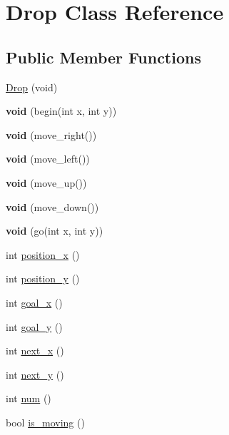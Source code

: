 \hypertarget{class_drop}{}\section{Drop Class Reference}
\label{class_drop}
\subsection*{Public Member Functions}
\begin{DoxyCompactItemize}
\item 
\mbox{\hyperlink{class_drop_a4f50edd210be7bcbea7ae60c36b00a47}{Drop}} (void)
\item 
\mbox{\label{class_drop_a82f9ec9050300a7a073df362bcbc078b}} 
{\bfseries void} (begin(int x, int y))
\item 
\mbox{\label{class_drop_a36e1bb6e31c1e8e5f72ab9ba67689cd1}} 
{\bfseries void} (move\+\_\+right())
\item 
\mbox{\label{class_drop_a1f5015019cf4f7fedea9ea867206dd3c}} 
{\bfseries void} (move\+\_\+left())
\item 
\mbox{\label{class_drop_aaa28139bd052f0a0a3aa62db602a8855}} 
{\bfseries void} (move\+\_\+up())
\item 
\mbox{\label{class_drop_aa21394ff11ff7825f699ec2d3a3d067c}} 
{\bfseries void} (move\+\_\+down())
\item 
\mbox{\label{class_drop_aebdc8ceeb4002f97508ab2504101e554}} 
{\bfseries void} (go(int x, int y))
\item 
int \mbox{\hyperlink{class_drop_a879a7ee2a43d7ae488eca0b266b45388}{position\+\_\+x}} ()
\item 
int \mbox{\hyperlink{class_drop_a7752d271ba81d744a9c503afd9766613}{position\+\_\+y}} ()
\item 
int \mbox{\hyperlink{class_drop_a2ed9f90dfadf25b9796413928477a4d9}{goal\+\_\+x}} ()
\item 
int \mbox{\hyperlink{class_drop_a8dae6265dfd15a8bcc16f99384dbb7b7}{goal\+\_\+y}} ()
\item 
int \mbox{\hyperlink{class_drop_a4146e3a66a4cc96d83cd25c3faeff64b}{next\+\_\+x}} ()
\item 
int \mbox{\hyperlink{class_drop_abcbcc7b38ef8c8e7e47dced87579d60e}{next\+\_\+y}} ()
\item 
int \mbox{\hyperlink{class_drop_a15b23e4aff0711c9b96f550e74ed72fa}{num}} ()
\item 
bool \mbox{\hyperlink{class_drop_afaaacdffc178e1b695ba31e2fd8c2bd9}{is\+\_\+moving}} ()
\end{DoxyCompactItemize}
